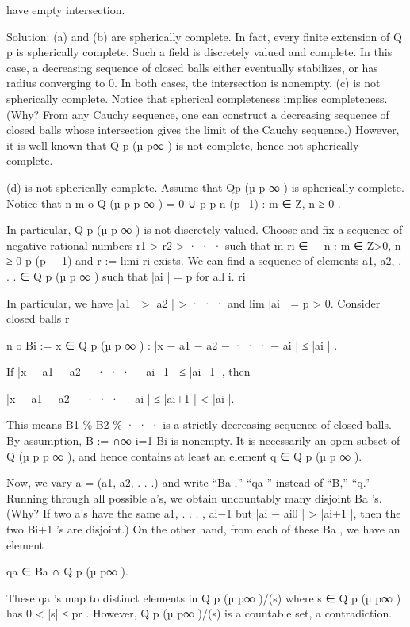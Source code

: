 \documentclass[UTF8,12pt]{ctexart}
\begin{document}
have empty intersection.

Solution: (a) and (b) are spherically complete. In fact, every finite extension of Q p is spherically complete. Such a field is discretely valued and complete. In this case, a decreasing sequence of closed balls either eventually stabilizes, or has radius converging to 0. In both cases, the intersection is nonempty. (c) is not spherically complete. Notice that spherical completeness implies completeness. (Why? From any Cauchy sequence, one can construct a decreasing sequence of closed balls whose intersection gives the limit of the Cauchy sequence.) However, it is well-known that Q p (µ p∞ ) is not complete, hence not spherically complete.

(d) is not spherically complete. Assume that Qp (µ p ∞ ) is spherically complete. Notice that n m o Q (µ p p ∞ ) = 0 ∪ p p n (p−1) : m ∈ Z, n ≥ 0 .

In particular, Q p (µ p ∞ ) is not discretely valued. Choose and fix a sequence of negative rational numbers r1 > r2 > · · · such that m ri ∈ − n : m ∈ Z>0, n ≥ 0 p (p − 1) and r := limi ri exists. We can find a sequence of elements a1, a2, . . . ∈ Q p (µ p ∞ ) such that |ai | = p for all i. ri

In particular, we have |a1 | > |a2 | > · · · and lim |ai | = p > 0. Consider closed balls r

n o Bi := x ∈ Q p (µ p ∞ ) : |x − a1 − a2 − · · · − ai | ≤ |ai | .

If |x − a1 − a2 − · · · − ai+1 | ≤ |ai+1 |, then

|x − a1 − a2 − · · · − ai | ≤ |ai+1 | < |ai |.

This means B1 \% B2 \% · · · is a strictly decreasing sequence of closed balls. By assumption, B := ∩∞ i=1 Bi is nonempty. It is necessarily an open subset of Q (µ p p ∞ ), and hence contains at least an element q ∈ Q p (µ p ∞ ).

Now, we vary a = (a1, a2, . . .) and write “Ba ,” “qa ” instead of “B,” “q.” Running through all possible a’s, we obtain uncountably many disjoint Ba ’s. (Why? If two a’s have the same a1, . . . , ai−1 but |ai − ai0 | > |ai+1 |, then the two Bi+1 ’s are disjoint.) On the other hand, from each of these Ba , we have an element

qa ∈ Ba ∩ Q p (µ p∞ ).

These qa ’s map to distinct elements in Q p (µ p∞ )/(s) where s ∈ Q p (µ p∞ ) has 0 < |s| ≤ pr . However, Q p (µ p∞ )/(s) is a countable set, a contradiction.
\end{document}
